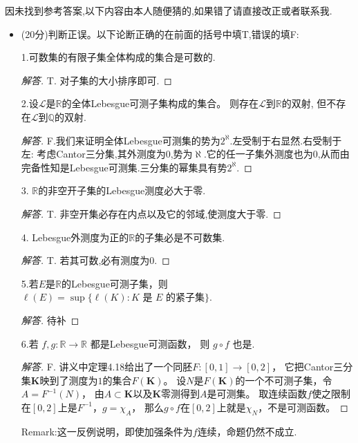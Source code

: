 因未找到参考答案,以下内容由本人随便猜的,如果错了请直接改正或者联系我.
\begin{itemize}
\item[一、](20分)判断正误。以下论断正确的在前面的括号中填T,错误的填F:

1.可数集的有限子集全体构成的集合是可数的.

\begin{proof}[解答]
T. 对子集的大小排序即可.
\end{proof}

2.设$ \mathcal{L} $是$ \mathbb{R} $的全体Lebesgue可测子集构成的集合。
则存在$ \mathcal{L} $到$ \mathbb{R} $的双射, 但不存在$ \mathcal{L} $到$ \mathbb{Q} $的双射.

\begin{proof}[解答]
F.我们来证明全体Lebesgue可测集的势为$2^\aleph.$左受制于右显然.右受制于左:
考虑Cantor三分集,其外测度为$0$,势为$\aleph.$它的任一子集外测度也为$0$,从而由完备性知是Lebesgue可测集.三分集的幂集具有势$2^\aleph.$
\end{proof}

3. $ \mathbb{R}  $的非空开子集的Lebesgue测度必大于零.

\begin{proof}[解答]
T. 非空开集必存在内点以及它的邻域,使测度大于零.
\end{proof}

4. Lebesgue外测度为正的$ \mathbb{R}  $的子集必是不可数集.

\begin{proof}[解答]
T. 若其可数,必有测度为$ 0 $.
\end{proof}

5.若$ E $是$ \mathbb{R}  $的Lebesgue可测子集，则 
$\ell(E)=\sup\{\ell(K):K \text{ 是 }E\text{ 的紧子集}\}$.
 
\begin{proof}[解答]
待补
\end{proof}
 
6.若 $f,g\colon\mathbb{R} \to \mathbb{R} $ 都是Lebesgue可测函数，
则 $g\circ f$ 也是.

\begin{proof}[解答]
F. 讲义中定理4.18给出了一个同胚$F\colon[0,1]\rightarrow[0,2]$，
它把Cantor三分集$\mathbf{K}$映到了测度为$1$的集合$F(\mathbf{K})$。
设$N$是$F(\mathbf{K})$的一个不可测子集，令$A=F^{-1}(N)$，
由$A\subset\mathbf{K}$以及$\mathbf{K}$零测得到$A$是可测集。
取连续函数$f$使之限制在$[0,2]$上是$F^{-1}$，$g=\chi_A$，
那么$g\circ f$在$[0,2]$上就是$\chi_N$，不是可测函数。
\end{proof}
Remark:这一反例说明，即使加强条件为$f$连续，命题仍然不成立.


\end{itemize}
